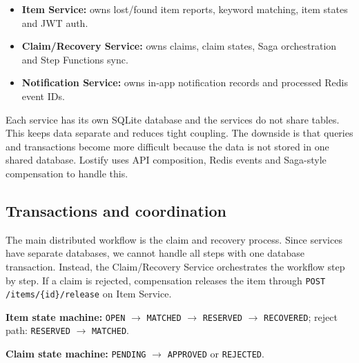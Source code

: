 \documentclass[11pt,a4paper]{article}
\begin{document}
\begin{itemize}
    \item \textbf{Item Service:} owns lost/found item reports, keyword matching, item states and JWT auth.
    \item \textbf{Claim/Recovery Service:} owns claims, claim states, Saga orchestration and Step Functions sync.
    \item \textbf{Notification Service:} owns in-app notification records and processed Redis event IDs.
\end{itemize}

Each service has its own SQLite database and the services do not share tables. This keeps data
separate and reduces tight coupling. The downside is that queries and transactions become more
difficult because the data is not stored in one shared database. Lostify uses API composition,
Redis events and Saga-style compensation to handle this.

\subsection{Transactions and coordination}

The main distributed workflow is the claim and recovery process. Since services have separate
databases, we cannot handle all steps with one database transaction. Instead, the Claim/Recovery
Service orchestrates the workflow step by step. If a claim is rejected, compensation releases the
item through \texttt{POST /items/\{id\}/release} on Item Service.

\textbf{Item state machine:}
\texttt{OPEN} $\rightarrow$ \texttt{MATCHED} $\rightarrow$ \texttt{RESERVED} $\rightarrow$ \texttt{RECOVERED};
reject path: \texttt{RESERVED} $\rightarrow$ \texttt{MATCHED}.

\textbf{Claim state machine:}
\texttt{PENDING} $\rightarrow$ \texttt{APPROVED} or \texttt{REJECTED}.

\newpage
\end{document}
